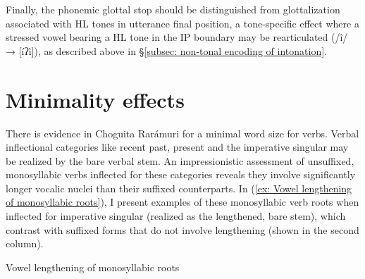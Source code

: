 Finally, the phonemic glottal stop should be distinguished from glottalization associated with HL tones in utterance final position, a tone-specific effect where a stressed vowel bearing a HL tone in the IP boundary may be rearticulated (/î/ → [íʔì]), as described above in §\ref{subsec: non-tonal encoding of intonation}.

\section{Minimality effects}
\label{subsec: minimal word size}

There is evidence in Choguita Rarámuri for a minimal word size for verbs. Verbal inflectional categories like recent past, present and the imperative singular may be realized by the bare verbal stem. An impressionistic assessment of unsuffixed, monosyllabic verbs inflected for these categories reveals they involve significantly longer vocalic nuclei than their suffixed counterparts. In (\ref{ex: Vowel lengthening of monosyllabic roots}), I present examples of these monosyllabic verb roots when inflected for imperative singular (realized as the lengthened, bare stem), which contrast with suffixed forms that do not involve lengthening (shown in the second column).

\ea\label{ex: Vowel lengthening of monosyllabic roots}
{Vowel lengthening of monosyllabic roots}

